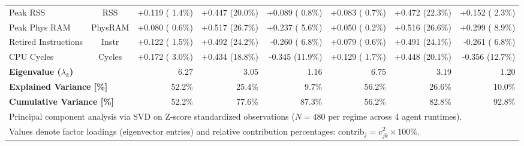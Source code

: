 \begin{table}[t]
\begin{tabular}{l c r r r r r r}
Peak RSS & RSS & +0.119 ( 1.4\%) & +0.447 (20.0\%) & +0.089 ( 0.8\%) & +0.083 ( 0.7\%) & +0.472 (22.3\%) & +0.152 ( 2.3\%) \\
Peak Phys RAM & PhysRAM & +0.080 ( 0.6\%) & +0.517 (26.7\%) & +0.237 ( 5.6\%) & +0.050 ( 0.2\%) & +0.516 (26.6\%) & +0.299 ( 8.9\%) \\
Retired Instructions & Instr & +0.122 ( 1.5\%) & +0.492 (24.2\%) & -0.260 ( 6.8\%) & +0.079 ( 0.6\%) & +0.491 (24.1\%) & -0.261 ( 6.8\%) \\
CPU Cycles & Cycles & +0.172 ( 3.0\%) & +0.434 (18.8\%) & -0.345 (11.9\%) & +0.129 ( 1.7\%) & +0.448 (20.1\%) & -0.356 (12.7\%) \\
\hline
\multicolumn{2}{l}{\textbf{Eigenvalue ($\lambda_k$)}} & 6.27 & 3.05 & 1.16 & 6.75 & 3.19 & 1.20 \\
\multicolumn{2}{l}{\textbf{Explained Variance [\%]}} & 52.2\% & 25.4\% & 9.7\% & 56.2\% & 26.6\% & 10.0\% \\
\multicolumn{2}{l}{\textbf{Cumulative Variance [\%]}} & 52.2\% & 77.6\% & 87.3\% & 56.2\% & 82.8\% & 92.8\% \\
\hline
\multicolumn{8}{l}{\footnotesize Principal component analysis via SVD on Z-score standardized observations ($N=480$ per regime across 4 agent runtimes).} \\
\multicolumn{8}{l}{\footnotesize Values denote factor loadings (eigenvector entries) and relative contribution percentages: $\text{contrib}_j = v_{jk}^2 \times 100\%$.} \\
\hline
\end{tabular}
\end{table}
